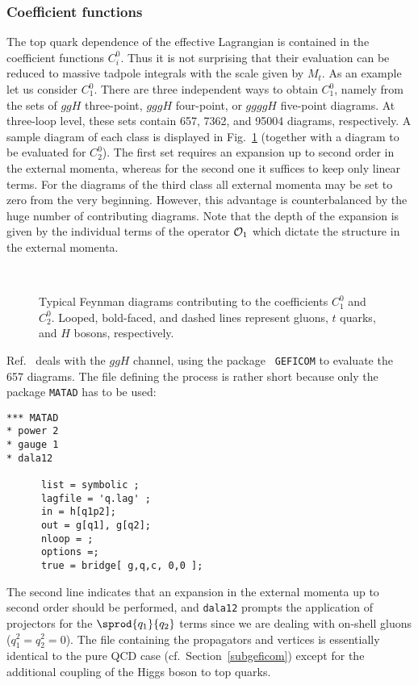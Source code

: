 \subsubsection{Coefficient functions}
%
The top quark dependence of the effective Lagrangian is contained in the
coefficient functions $C_i^0$. Thus it is not surprising that their
evaluation can be reduced to massive tadpole integrals with the scale
given by $M_t$.  As an example let us consider $C_1^0$.  There are three
independent ways to obtain $C_1^0$, namely from the sets of $ggH$
three-point, $gggH$ four-point, or $ggggH$ five-point diagrams.  At
three-loop level, these sets contain 657, 7362, and 95004 diagrams,
respectively. A sample diagram of each class is displayed in
Fig.~\ref{fighggc1} (together with a diagram to be evaluated for
$C_2^0$). The first set requires an expansion up to second order in the
external momenta, whereas for the second one it suffices to keep only
linear terms. For the diagrams of the third class all external momenta
may be set to zero from the very beginning. However, this advantage is
counterbalanced by the huge number of contributing diagrams.  Note that the
depth of the expansion is given by the individual terms of the operator
${\cal O}_1$ which dictate the
structure in the external momenta.
%
\begin{figure}[t]
\begin{center}
\leavevmode
\epsfxsize=15cm
\\
\parbox{\captionwidth}{
\caption[]{\label{fighggc1}
  Typical Feynman diagrams contributing to the coefficients
  $C_1^0$ and $C_2^0$.  Looped, bold-faced, and dashed lines represent
  gluons, $t$ quarks, and $H$ bosons, respectively.}}
\end{center}
\end{figure}

Ref.~\cite{CheKniSte97hgg} deals with the $ggH$ channel, using the package {\tt
  GEFICOM} to evaluate the 657 diagrams.  The file defining the process
is rather short because only the package {\tt MATAD} has to be
used:
\begin{verbatim}
*** MATAD
* power 2
* gauge 1
* dala12

      list = symbolic ;
      lagfile = 'q.lag' ;
      in = h[q1p2];
      out = g[q1], g[q2]; 
      nloop = ;
      options =;
      true = bridge[ g,q,c, 0,0 ];  
\end{verbatim}
The second line indicates that an expansion in the external momenta up
to second order should be performed, and {\tt dala12} prompts the
application of projectors for the $\sprod{q_1}{q_2}$ terms since we are dealing
with on-shell gluons ($q_1^2=q_2^2=0$).  The file containing the
propagators and vertices is essentially identical to the pure QCD case
(cf.~Section~\ref{subgeficom}) except for the additional coupling of the Higgs
boson to top quarks.

